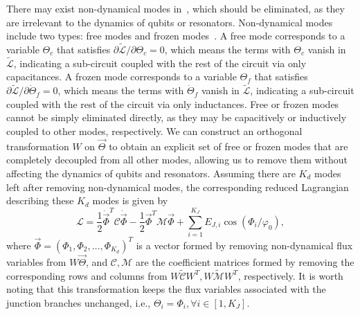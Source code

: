 \documentclass[a4paper,onecolumn,11pt,unpublished]{quantumarticle}
\begin{document}
There may exist non-dynamical modes in~, which should be eliminated, as they are irrelevant to the dynamics of qubits or resonators. Non-dynamical modes include two types: free modes and frozen modes~\cite{Ding2021Freemode,Chitta2022Computeraided}. A free mode corresponds to a variable $\Theta_c$ that satisfies $\partial \tilde{\mathcal{L}} / \partial \Theta_c = 0$, which means the terms with $\Theta_c$ vanish in $\tilde{\mathcal{L}}$, indicating a sub-circuit coupled with the rest of the circuit via only capacitances. A frozen mode corresponds to a variable $\Theta_f$ that satisfies $\partial \tilde{\mathcal{L}} / \partial \dot{\Theta}_f = 0$, which means the terms with $\dot{\Theta}_f$ vanish in $\tilde{\mathcal{L}}$, indicating a sub-circuit coupled with the rest of the circuit via only inductances. Free or frozen modes cannot be simply eliminated directly, as they may be capacitively or inductively coupled to other modes, respectively. We can construct an orthogonal transformation $W$ on $\vec \Theta$ to obtain an explicit set of free or frozen modes that are completely decoupled from all other modes, allowing us to remove them without affecting the dynamics of qubits and resonators. 
Assuming there are $K_d$ modes left after removing non-dynamical modes, the corresponding reduced Lagrangian describing these $K_d$ modes is given by
\begin{equation}
    \mathcal{L} = \frac{1}{2} \dot{\vec{\Phi}}^T \mathcal{C} \dot{\vec{\Phi}}
    - \frac{1}{2} \vec \Phi^T \mathcal{M} \vec \Phi
    + \sum_{i=1}^{K_J} E_{J, i} \cos\left(\Phi_i / \varphi_0\right),
    \label{eq:circuit_lagrangian_reduced}
\end{equation}
where $\vec \Phi = \left( \Phi_1, \Phi_2, \ldots, \Phi_{K_d} \right)^T$ is a vector formed by removing non-dynamical flux variables from $W \vec \Theta$, and $\mathcal{C}, \mathcal{M}$ are the coefficient matrices formed by removing the corresponding rows and columns from $W \tilde{\mathcal{C}} W^T, W \tilde{\mathcal{M}} W^T$, respectively. It is worth noting that this transformation keeps the flux variables associated with the junction branches unchanged, i.e., $\Theta_i = \Phi_i, \forall i \in \left[1, K_J \right]$.
\end{document}
